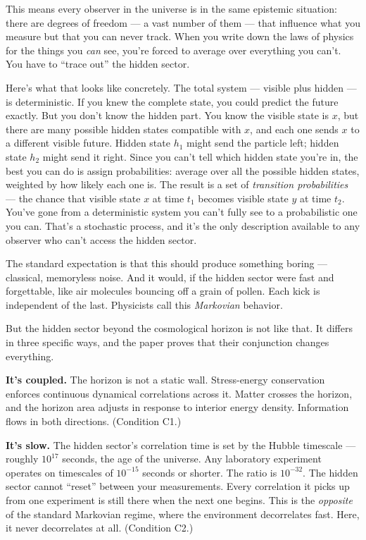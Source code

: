 \documentclass[
]{article}
\begin{document}
This means every observer in the universe is in the same epistemic
situation: there are degrees of freedom --- a vast number of them ---
that influence what you measure but that you can never track. When you
write down the laws of physics for the things you \emph{can} see, you're
forced to average over everything you can't. You have to ``trace out''
the hidden sector.

Here's what that looks like concretely. The total system --- visible
plus hidden --- is deterministic. If you knew the complete state, you
could predict the future exactly. But you don't know the hidden part.
You know the visible state is \(x\), but there are many possible hidden
states compatible with \(x\), and each one sends \(x\) to a different
visible future. Hidden state \(h_1\) might send the particle left;
hidden state \(h_2\) might send it right. Since you can't tell which
hidden state you're in, the best you can do is assign probabilities:
average over all the possible hidden states, weighted by how likely each
one is. The result is a set of \emph{transition probabilities} --- the
chance that visible state \(x\) at time \(t_1\) becomes visible state
\(y\) at time \(t_2\). You've gone from a deterministic system you can't
fully see to a probabilistic one you can. That's a stochastic process,
and it's the only description available to any observer who can't access
the hidden sector.

The standard expectation is that this should produce something boring
--- classical, memoryless noise. And it would, if the hidden sector were
fast and forgettable, like air molecules bouncing off a grain of pollen.
Each kick is independent of the last. Physicists call this
\emph{Markovian} behavior.

But the hidden sector beyond the cosmological horizon is not like that.
It differs in three specific ways, and the paper proves that their
conjunction changes everything.

\textbf{It's coupled.} The horizon is not a static wall. Stress-energy
conservation enforces continuous dynamical correlations across it.
Matter crosses the horizon, and the horizon area adjusts in response to
interior energy density. Information flows in both directions.
(Condition C1.)

\textbf{It's slow.} The hidden sector's correlation time is set by the
Hubble timescale --- roughly \(10^{17}\) seconds, the age of the
universe. Any laboratory experiment operates on timescales of
\(10^{-15}\) seconds or shorter. The ratio is \(10^{-32}\). The hidden
sector cannot ``reset'' between your measurements. Every correlation it
picks up from one experiment is still there when the next one begins.
This is the \emph{opposite} of the standard Markovian regime, where the
environment decorrelates fast. Here, it never decorrelates at all.
(Condition C2.)
\end{document}
